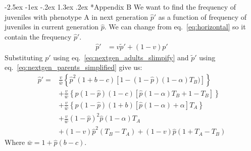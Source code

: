 \documentclass[12pt]{extarticle}
\makeatletter
\renewcommand\section{\@startsection {section}{1}{\z@}%
     {-2.5ex \@plus -1ex \@minus -.2ex}%
     {1.3ex \@plus.2ex}%
    {\Large\bfseries}}
\makeatother
\begin{document}
\newpage
\section*{Appendix B} 
We want to find the frequency of juveniles with phenotype A in next generation $\hat{p}'$ as a function of frequency
of juveniles in current generation $\hat{p}$. We can change from eq.~\ref{eq:horizontal} so it contain the frequency $\hat{p}'$.
\begin{equation}\label{eq:appendix_b_1}\tag{B.1}
  \begin{aligned}
  \hat{p}' & = v \tilde{p}' + (1-v) p'
  \end{aligned}
  \end{equation}
Substituting $p'$ using eq.~\ref{eq:nextgen_adults_slimpify} and $\tilde{p}'$ using eq.~\ref{eq:nextgen_parents_simplified} give us:
\begin{equation}\label{eq:appendix_b_2}\tag{B.2}
  \begin{aligned}
  \hat{p}'  = & \frac{v}{\bar{w}}\left\{\hat{p}^2(1+b-c)\left[1-(1-\hat{p})(1-\alpha)T_B)\right]\right\} \\
  & + \frac{v}{\bar{w}}\left\{ \hat{p}(1-\hat{p})(1-c)\left[ \hat{p}(1-\alpha)T_B + 1 - T_B \right] \right\} \\
  & + \frac{v}{\bar{w}}\left\{ \hat{p}(1-\hat{p})(1+b)\left[\hat{p}(1-\alpha) + \alpha \right]T_A \right\} \\
  & + \frac{v}{\bar{w}}(1-\hat{p})^2\hat{p}(1-\alpha)T_A \\
  & + (1-v)\hat{p}^2(T_B-T_A) + (1-v)\hat{p}(1+T_A-T_B)
  \end{aligned}
  \end{equation}
  Where $\bar{w} = 1 + \hat{p}(b-c)$.
\end{document}
